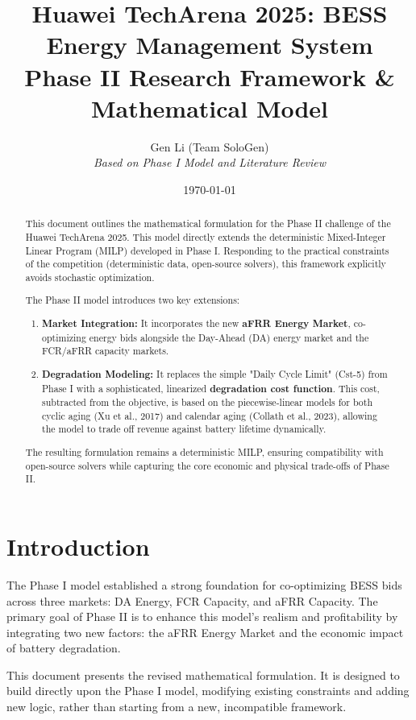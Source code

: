 \documentclass[11pt, a4paper]{article}
\title{Huawei TechArena 2025: BESS Energy Management System \\ \large Phase II Research Framework \& Mathematical Model}
\author{Gen Li (Team SoloGen) \\ \small \textit{Based on Phase I Model and Literature Review}}
\date{\today} %
\begin{document}
\maketitle
\thispagestyle{fancy}

\begin{abstract}
This document outlines the mathematical formulation for the Phase II challenge of the Huawei TechArena 2025. This model directly extends the deterministic Mixed-Integer Linear Program (MILP) developed in Phase I. Responding to the practical constraints of the competition (deterministic data, open-source solvers), this framework explicitly avoids stochastic optimization.

The Phase II model introduces two key extensions:
\begin{enumerate}
    \item \textbf{Market Integration:} It incorporates the new \textbf{aFRR Energy Market}, co-optimizing energy bids alongside the Day-Ahead (DA) energy market and the FCR/aFRR capacity markets.
    \item \textbf{Degradation Modeling:} It replaces the simple "Daily Cycle Limit" (Cst-5) from Phase I with a sophisticated, linearized \textbf{degradation cost function}. This cost, subtracted from the objective, is based on the piecewise-linear models for both cyclic aging (Xu et al., 2017) and calendar aging (Collath et al., 2023), allowing the model to trade off revenue against battery lifetime dynamically.
\end{enumerate}
The resulting formulation remains a deterministic MILP, ensuring compatibility with open-source solvers while capturing the core economic and physical trade-offs of Phase II.
\end{abstract}


\section{Introduction}
The Phase I model established a strong foundation for co-optimizing BESS bids across three markets: DA Energy, FCR Capacity, and aFRR Capacity. The primary goal of Phase II is to enhance this model's realism and profitability by integrating two new factors: the aFRR Energy Market and the economic impact of battery degradation.

This document presents the revised mathematical formulation. It is designed to build directly upon the Phase I model, modifying existing constraints and adding new logic, rather than starting from a new, incompatible framework.
\end{document}
